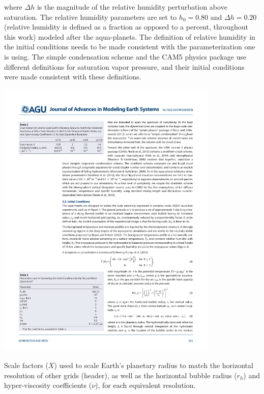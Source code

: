 where $\Delta h$ is the magnitude of the relative humidity perturbation above saturation. The relative humidity parameters are set to $h_0 = 0.80$ and $\Delta h  = 0.20$ (relative humidity is defined as a fraction as opposed to a percent, throughout this work) modeled after the aqua-planets. The definition of relative humidity in the initial conditions needs to be made consistent with the parameterization one is using. The simple condensation scheme and the CAM5 physics package use different definitions for saturation vapor pressure, and their initial conditions were made consistent with these definitions.

\begin{table}
\begin{center}
\noindent\includegraphics[width=25pc,angle=0]{chapter3/table2.pdf}\\
\end{center}
\caption{Scale factors ($X$) used to scale Earth’s planetary radius to match the horizontal resolution of other grids (header), as well as the horizontal bubble radius ($r_h$) and hyper-viscosity coefficients ($\nu$), for each equivalent resolution.}
\label{tbl:table3-2}
\end{table}

